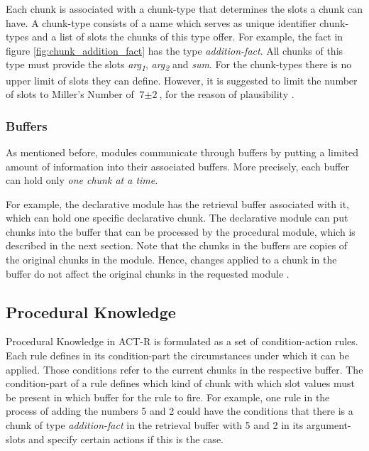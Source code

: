 Each chunk is associated with a chunk-type that determines the slots a chunk can have. A chunk-type consists of a name which serves as unique identifier chunk-types and a list of slots the chunks of this type offer. For example, the fact in figure \ref{fig:chunk_addition_fact} has the type \emph{addition-fact}. All chunks of this type must provide the slots \emph{arg\textsubscript{1}}, \emph{arg\textsubscript{2}} and \emph{sum}. For the chunk-types there is no upper limit of slots they can define. However, it is suggested to limit the number of slots to Miller's Number \label{millers_number} of $\text{7} \pm \text{2}$, for the reason of plausibility \cite[230]{stewart_deconstructing_2007}. 

\subsubsection{Buffers}

As mentioned before, modules communicate through buffers by putting a limited amount of information into their associated buffers. More precisely, each buffer can hold only \emph{one chunk at a time}.

For example, the declarative module has the retrieval buffer associated with it, which can hold one specific declarative chunk. The declarative module can put chunks into the buffer that can be processed by the procedural module, which is described in the next section. Note that the chunks in the buffers are copies of the original chunks in the module. Hence, changes applied to a chunk in the buffer do not affect the original chunks in the requested module \cite[unit 1, pp. 18\psq]{actr_tutorial}.

\subsection{Procedural Knowledge}
\label{procedural_knowledge}

Procedural Knowledge in ACT-R is formulated as a set of condition-action rules. Each rule defines in its condition-part the circumstances under which it can be applied. Those conditions refer to the current chunks in the respective buffer. The condition-part of a rule defines which kind of chunk with which slot values must be present in which buffer for the rule to fire. For example, one rule in the process of adding the numbers 5 and 2 could have the conditions that there is a chunk of type \emph{addition-fact} in the retrieval buffer with 5 and 2 in its argument-slots and specify certain actions if this is the case.

